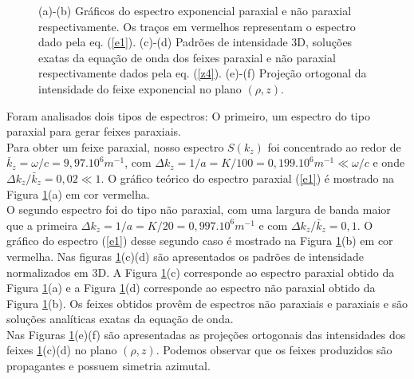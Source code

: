 \begin{figure}[h]
\caption{(a)-(b) Gr\'aficos do espectro exponencial paraxial e n\~ao paraxial respectivamente. Os tra\c{c}os em vermelhos representam o espectro dado pela eq. (\ref{e1}). (c)-(d) Padr\~oes de intensidade 3D, solu\c{c}\~oes exatas da equa\c{c}\~ao de onda dos feixes paraxial e n\~ao paraxial respectivamente dados pela eq. (\ref{z4}). (e)-(f) Proje\c{c}\~ao ortogonal da intensidade do feixe exponencial no plano $(\rho,z)$.}
\label{fig1}
\end{figure}
Foram analisados dois tipos de espectros: O primeiro, um espectro do tipo paraxial para gerar feixes paraxiais.\\
 Para obter um feixe paraxial, nosso espectro $S(k_z)$ foi concentrado ao redor de $\bar{k}_z = \omega /c=9,97.10^6 m^{-1}$, com $\Delta k_z =1/a = K/100  = 0,199.10^6 m^{-1}\ll \omega /c$ e onde $\Delta k_z/\bar{k}_z=0,02\ll 1$. O gr\'afico te\'orico do espectro paraxial (\ref{e1}) \'e mostrado na Figura \ref{fig1}(a) em cor vermelha.\\
O segundo espectro foi do tipo n\~ao paraxial, com uma largura de banda maior que a primeira $\Delta k_z = 1/a = K/20 = 0,997.10^6 m^{-1}$ e com $\Delta k_z/\bar{k}_z= 0,1$. O gr\'afico do espectro (\ref{e1}) desse segundo caso \'e mostrado na Figura \ref{fig1}(b) em cor vermelha.
Nas figuras \ref{fig1}(c)(d) s\~ao apresentados os padr\~oes de intensidade normalizados em 3D. A Figura \ref{fig1}(c) corresponde ao espectro paraxial obtido da Figura \ref{fig1}(a) e a Figura \ref{fig1}(d) corresponde ao espectro n\~ao paraxial obtido da Figura \ref{fig1}(b). Os feixes obtidos prov\^em de espectros n\~ao paraxiais e paraxiais e s\~ao solu\c{c}\~oes anal\'iticas exatas da equa\c{c}\~ao de onda.\\
Nas Figuras \ref{fig1}(e)(f) s\~ao apresentadas as proje\c{c}\~oes ortogonais das intensidades dos feixes \ref{fig1}(c)(d) no plano $(\rho,z)$. Podemos observar que os feixes produzidos s\~ao propagantes e possuem simetria azimutal.
